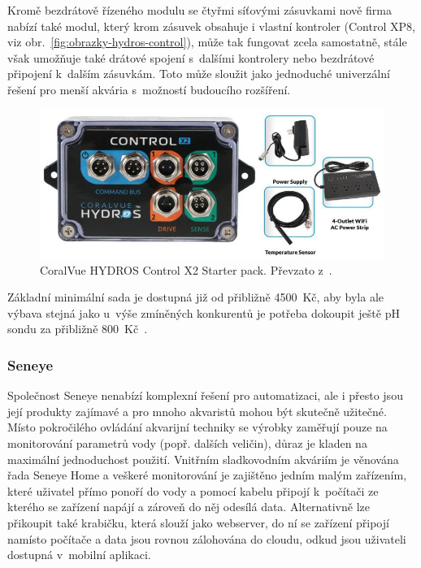            Kromě bezdrátově řízeného modulu se čtyřmi síťovými zásuvkami nově firma nabízí také modul, který krom zásuvek obsahuje i vlastní kontroler (Control XP8, viz obr.~\ref{fig:obrazky-hydros-control}), může tak fungovat zcela samostatně, stále však umožňuje také drátové spojení s~dalšími kontrolery nebo bezdrátové připojení k~dalším zásuvkám. Toto může sloužit jako jednoduché univerzální řešení pro menší akvária s~možností budoucího rozšíření. 

            \begin{figure}[h!]
                \centering
                \includegraphics[width=\textwidth]{obrazky/trh/hydros-x2-starter-pack.jpg}
                \caption{CoralVue HYDROS Control X2 Starter pack. Převzato z~\cite{eshop-coralvue-hydros}.}
                \label{fig:obrazky-trh-hydros-x2-starter-pack-jpg}
            \end{figure}
            
            Základní minimální sada je dostupná již od přibližně \qty{4500}{Kč}, aby byla ale výbava stejná jako u~výše zmíněných konkurentů je potřeba dokoupit ještě pH sondu za přibližně \qty{800}{Kč}~\cite{coralvuehydros,eshop-coralvue-hydros}.
            
        \subsubsection{Seneye}
            Společnost Seneye nenabízí komplexní řešení pro automatizaci, ale i přesto jsou její produkty zajímavé a pro mnoho akvaristů mohou být skutečně užitečné. Místo pokročilého ovládání akvarijní techniky se výrobky zaměřují pouze na monitorování parametrů vody (popř. dalších veličin), důraz je kladen na maximální jednoduchost použití. Vnitřním sladkovodním akváriím je věnována řada Seneye Home a veškeré monitorování je zajištěno jedním malým zařízením, které uživatel přímo ponoří do vody a pomocí kabelu připojí k~počítači ze kterého se zařízení napájí a zároveň do něj odesílá data. Alternativně lze přikoupit také krabičku, která slouží jako webserver, do ní se zařízení připojí namísto počítače a data jsou rovnou zálohována do cloudu, odkud jsou uživateli dostupná v~mobilní aplikaci.

